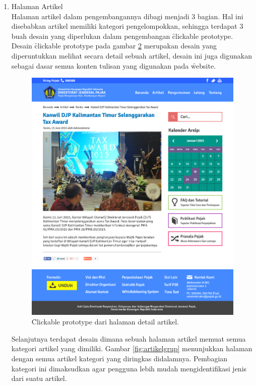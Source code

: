 \begin{enumerate}
\begin{figure}
		\label{fig:beranda}
	\end{figure}
	\item Halaman Artikel \\
	Halaman artikel dalam pengembangannya dibagi menjadi 3 bagian. Hal ini disebabkan artikel memiliki kategori pengelompokkan, sehingga terdapat 3 buah desain yang diperlukan dalam pengembangan \f{clickable prototype}. Desain \f{clickable prototype} pada gambar \ref{fig:artikel} merupakan desain yang diperuntukkan melihat secara detail sebuah artikel, desain ini juga digunakan sebagai dasar semua konten tulisan yang digunakan pada \f{website}.
		\begin{figure}
			\centering
			\includegraphics[width=\textwidth]
			{pics/Artikel.jpg}
			\caption{\f{Clickable prototype} dari halaman detail artikel.}
			\label{fig:artikel}
		\end{figure}
	\pagebreak
	Selanjutnya terdapat desain dimana sebuah halaman artikel memuat semua kategori artikel yang dimiliki. Gambar \ref{fig:artikelgrup} menunjukkan halaman dengan semua artikel kategori yang diringkas didalamnya. Pembagian kategori ini dimaksudkan agar pengguna lebih mudah mengidentifikasi jenis dari suatu artikel.

\end{enumerate}
